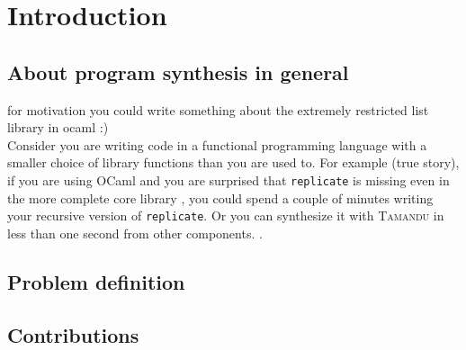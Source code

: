 \newcommand{\package}{\emph}

\chapter{Introduction}\label{ch:introduction}

\section{About program synthesis in general}


for motivation you could write something about the extremely restricted list library in ocaml :)\\
Consider you are writing code in a functional programming language with a smaller choice of library functions than you are used to. For example (true story), if you are using OCaml and you are surprised that \lstinline?replicate? is missing even in the more complete core library , you could spend a couple of minutes writing your recursive version of \lstinline?replicate?. Or you can synthesize it with \textsc{Tamandu} in less than one second from other components. .


\section{Problem definition}
  
\section{Contributions}

